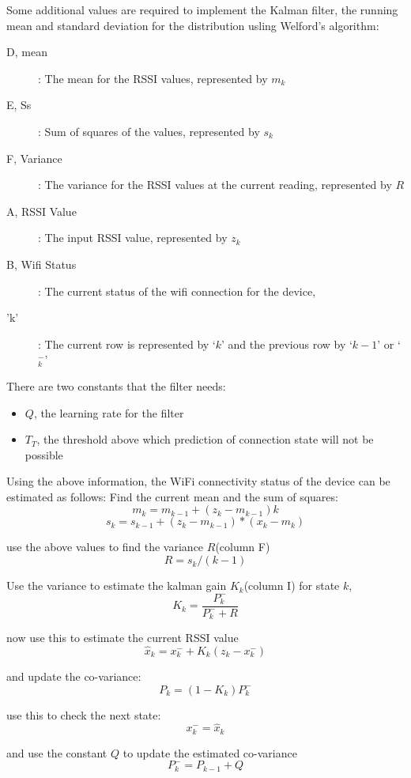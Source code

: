 \documentclass[a4paper,10pt]{article}
\begin{document}
Some additional values are required to implement the Kalman filter, the running mean and standard deviation for the distribution usling Welford's algorithm:
\begin{description}
 \item [D, mean]: The mean for the RSSI values, represented by $ m_k$
 \item [E, Ss]: Sum of squares of the values, represented by $ s_k$
 \item [F, Variance]: The variance for the RSSI values at the current reading, represented by $R$
 \item [A, RSSI Value]: The input RSSI value, represented by $z_k$
 \item [B, Wifi Status]: The current status of the wifi connection for the device,
 \item ['k']: The current row is represented by `$k$' and the previous row by `$k-1$' or `$^-_k$'
\end{description}

There are two constants that the filter needs:
\begin{itemize}
 \item $Q$, the learning rate for the filter
 \item $T_T$, the threshold above which prediction of connection state will not be possible
\end{itemize}

Using the above information, the WiFi connectivity status of the device can be estimated as follows:
Find the current mean and the sum of squares:
\[m_k = m_{k-1}+ (z_k - m_{k-1})k \]
\[s_k = s_{k-1}+ (z_k - m_{k-1})*(x_k-m_k) \]

use the above values to find the variance $R$(column F)
\[R = s_k/(k-1) \]

Use the variance to estimate the kalman gain $K_k$(column I) for state $k$,
\[K_k = \frac{P^-_k}{P^-_k+R}  \]

now use this to estimate the current RSSI value
\[\hat{x}_k = x^-_k + K_k(z_k - x^-_k) \]

and update the co-variance: 
\[P_k = (1-K_k)P^-_k \]

use this to check the next state:
\[x^-_k = \hat{x}_k \]

and use the constant $Q$ to update the estimated co-variance
\[P^-_k = P_{k-1}+Q \]
\end{document}
